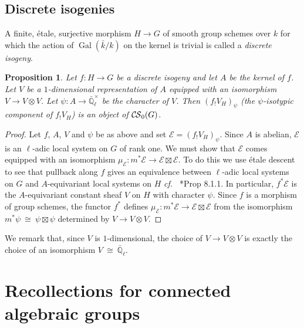 \documentclass[10pt]{amsart}
\theoremstyle{plain}
\newtheorem{proposition}[theorem]{Proposition}
\theoremstyle{definition}
\newcommand{\EE}{\mathbb{\bar Q}_\ell}
\newcommand{\bFq}{\bar{k}}
\newcommand{\Fq}{k}
\newcommand{\EEx}{\EE^\times}
\DeclareMathOperator{\Gal}{Gal}
\newcommand{\iso}{{\ \cong\ }}
\newcommand{\cs}[1]{{\mathcal{#1}}}
\newcommand{\CS}{{\mathcal{C\hskip-0.8pt S}}}
\newcommand{\bCS}{{\CS_0}}
\begin{document}
\subsection{Discrete isogenies}\label{ssec:discrete_isogenies}

A finite, \'etale, surjective morphism $H\to G$ of smooth group schemes over $\Fq$ for which the action of $\Gal(\bFq/\Fq)$ on the kernel is trivial is called a {\it discrete isogeny}.

\begin{proposition}\label{prop:finite}
Let $f: H \to G$ be a discrete isogeny and let $A$ be the kernel of $f$.
Let $V$ be a $1$-dimensional representation of $A$ 
equipped with an isomorphism $V\to V\otimes V$.
Let $\psi : A \to \EEx$ be the character of $V$.
Then $(f_! V_H)_\psi$ (the $\psi$-isotypic component of $f_!V_H$) is an object of $\bCS(G)$.
\end{proposition}

\begin{proof}
Let $f$, $A$, $V$ and $\psi$ be as above and set $\cs{E} = (f_! V_H)_\psi$.
Since $A$ is abelian, $\cs{E}$ is an $\ell$-adic local system on $G$ of rank one.
We must show that $\cs{E}$ comes equipped with an isomorphism $\mu_\cs{E} : m^* \cs{E} \to \cs{E}\boxtimes\cs{E}$.
To do this we use \'etale descent to see that pullback along $f$ gives an equivalence between $\ell$-adic local systems on $G$ and $A$-equivariant local systems on $H$ {\it cf.\ } \cite{bernstein-luntz:equivariant_sheaves}*{Prop 8.1.1}. 
In particular, $f^*\cs{E}$ is the $A$-equivariant constant sheaf $V$ on $H$ with character $\psi$.
Since $f$ is a morphism of group schemes, the functor $f^*$ defines $\mu_\cs{E} : m^*\cs{E} \to \cs{E}\boxtimes\cs{E}$
from the isomorphism $m^*\psi \iso \psi \boxtimes\psi$ determined by $V\to V\otimes V$.
\end{proof}

We remark that, since $V$ is $1$-dimensional, the choice of $V \to V\otimes V$ is exactly the choice of an isomorphism $V\iso \EE$.

\section{Recollections for connected algebraic groups}\label{ssec:connected}

\end{document}
